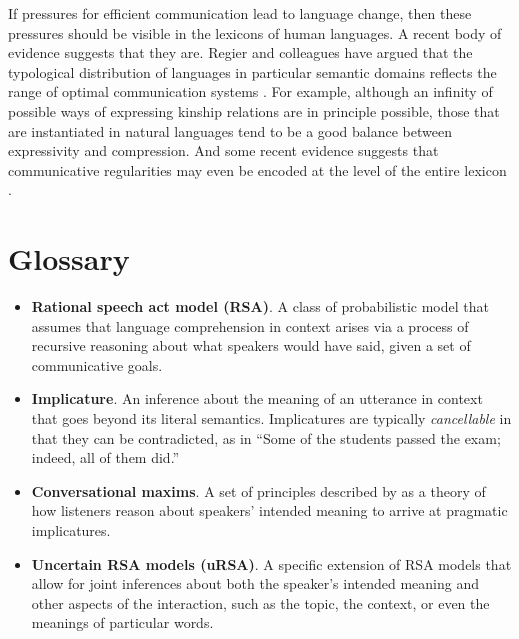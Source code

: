 \documentclass[]{elsarticle}
\begin{document}
If pressures for efficient communication lead to language change, then
these pressures should be visible in the lexicons of human languages. A
recent body of evidence suggests that they are. Regier and colleagues
have argued that the typological distribution of languages in particular
semantic domains reflects the range of optimal communication systems
\citep[e.g.,][]{regier,2008,kemp2012,xu2014}. For example, although an infinity of possible ways of
expressing kinship relations are in principle possible, those that are
instantiated in natural languages tend to be a good balance between
expressivity and compression. And some recent evidence suggests that
communicative regularities may even be encoded at the level of the
entire lexicon \citep{lewis2016}.

\section{Glossary}\label{glossary}

\begin{itemize}
\item \textbf{Rational speech act model (RSA)}. A class of probabilistic model that assumes that language comprehension in context arises via a process of
  recursive reasoning about what speakers would have said, given a set
  of communicative goals.

\item \textbf{Implicature}. An inference about the meaning of an utterance in context that goes beyond its literal semantics. Implicatures are typically \emph{cancellable} in that they can be contradicted, as in ``Some of the students passed the exam; indeed, all of them did.''

\item \textbf{Conversational maxims}. A set of principles described by \citet{grice1975} as a theory of how listeners reason about speakers' intended meaning to arrive at pragmatic implicatures.

\item \textbf{Uncertain RSA models (uRSA)}. A specific extension of RSA models that allow for joint inferences about both the speaker's intended meaning and other aspects of the interaction, such as the topic, the context, or even the meanings of particular words.

\end{itemize}
\end{document}
